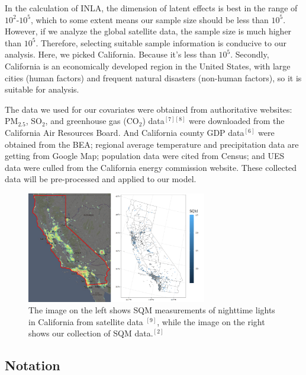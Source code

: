 \documentclass{mcmthesis}
\begin{document}
In the calculation of INLA, the dimension of latent effects is best in the range of $10^{2}$-$10^{5}$, which to some extent means our sample size should be less than $10^{5}$. However, if we analyze the global satellite data, the sample size is much higher than $10^{5}$. Therefore, selecting suitable sample information is conducive to our analysis. Here, we picked California. Because it's less than $10^{5}$. Secondly, California is an economically developed region in the United States, with large cities (human factors) and frequent natural disasters (non-human factors), so it is suitable for analysis.

The data we used for our covariates were obtained from authoritative websites: PM$_{2.5}$, SO$_{2}$, and greenhouse gas (CO$_{2}$) data$^{[7][8]}$ were downloaded from the California Air Resources Board. And California county GDP data$^{[6]}$ were obtained from the BEA; regional average temperature and precipitation data are getting from Google Map; population data were cited from Census; and UES data were culled from the California energy commission website. These collected data will be pre-processed and applied to our model.

\begin{figure}[htp]
    \centering
    \includegraphics[width=0.7\textwidth]{images/california11.png}
    \caption{The image on the left shows SQM measurements of nighttime lights in California from satellite data $^{[9]}$, while the image on the right shows our collection of SQM data.$^{[2]}$}
    \label{pre1}
\end{figure}


\newpage
\subsection{Notation}
\end{document}
